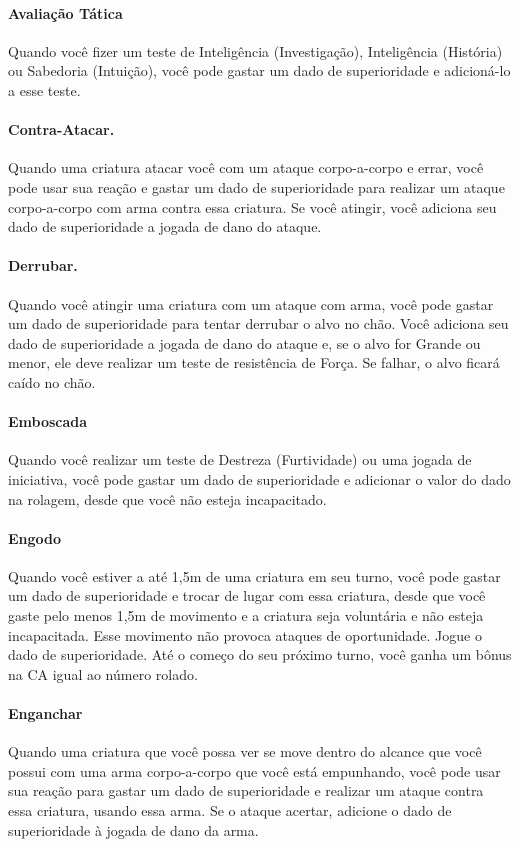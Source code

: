 \documentclass{RPG_Adventure}[2021/10/20]
\begin{document}
\paragraph{Avaliação Tática} Quando você fizer um teste de Inteligência
(Investigação), Inteligência (História) ou Sabedoria (Intuição), você pode
gastar um dado de superioridade e adicioná-lo a esse teste.

\paragraph{Contra-Atacar.} Quando uma criatura atacar você com um ataque
corpo-a-corpo e errar, você pode usar sua reação e gastar um dado de
superioridade para realizar um ataque corpo-a-corpo com arma contra essa
criatura.  Se você atingir, você adiciona seu dado de superioridade a jogada de
dano do ataque.

\paragraph{Derrubar.} Quando você atingir uma criatura com um ataque com arma,
você pode gastar um dado de superioridade para tentar derrubar o alvo no chão.
Você adiciona seu dado de superioridade a jogada de dano do ataque e, se o alvo
for Grande ou menor, ele deve realizar um teste de resistência de Força. Se
falhar, o alvo ficará caído no chão.

\paragraph{Emboscada} Quando você realizar um teste de Destreza (Furtividade) ou
uma jogada de iniciativa, você pode gastar um dado de superioridade e adicionar
o valor do dado na rolagem, desde que você não esteja incapacitado.

\paragraph{Engodo} Quando você estiver a até 1,5m de uma criatura em seu turno,
você pode gastar um dado de superioridade e trocar de lugar com essa criatura,
desde que você gaste pelo menos 1,5m de movimento e a criatura seja voluntária e
não esteja incapacitada. Esse movimento não provoca ataques de oportunidade.
Jogue o dado de superioridade. Até o começo do seu próximo turno, você ganha um
bônus na CA igual ao número rolado.

\paragraph{Enganchar} Quando uma criatura que você possa ver se move dentro do
alcance que você possui com uma arma corpo-a-corpo que você está empunhando,
você pode usar sua reação para gastar um dado de superioridade e realizar um
ataque contra essa criatura, usando essa arma. Se o ataque acertar, adicione o
dado de superioridade à jogada de dano da arma.
\end{document}
